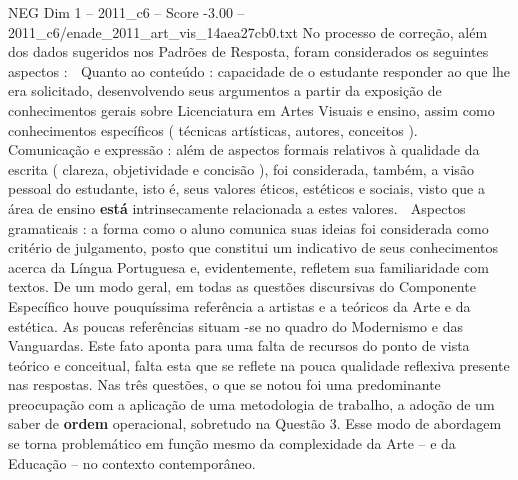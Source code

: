 \begin{textsample}{NEG Dim 1 – 2011\_c6 – Score -3.00 – 2011\_c6/enade\_2011\_art\_vis\_14aea27cb0.txt}
No processo de correção, além dos dados sugeridos nos Padrões de Resposta, foram considerados os seguintes aspectos :  Quanto ao conteúdo : capacidade de o estudante responder ao que lhe era solicitado, desenvolvendo seus argumentos a partir da exposição de conhecimentos gerais sobre Licenciatura em Artes Visuais e ensino, assim como conhecimentos específicos ( técnicas artísticas, autores, conceitos ).  Comunicação e expressão : além de aspectos formais relativos à qualidade da escrita ( clareza, objetividade e concisão ), foi considerada, também, a visão pessoal do estudante, isto é, seus valores éticos, estéticos e sociais, visto que a área de ensino \textbf{está} intrinsecamente relacionada a estes valores.  Aspectos gramaticais : a forma como o aluno comunica suas ideias foi considerada como critério de julgamento, posto que constitui um indicativo de seus conhecimentos acerca da Língua Portuguesa e, evidentemente, refletem sua familiaridade com textos.
De um modo geral, em todas as questões discursivas do Componente Específico houve pouquíssima referência a artistas e a teóricos da Arte e da estética.
As poucas referências situam -se no quadro do Modernismo e das Vanguardas.
Este fato aponta para uma falta de recursos do ponto de vista teórico e conceitual, falta esta que se reflete na pouca qualidade reflexiva presente nas respostas.
Nas três questões, o que se notou foi uma predominante preocupação com a aplicação de uma metodologia de trabalho, a adoção de um saber de \textbf{ordem} operacional, sobretudo na Questão 3.
Esse modo de abordagem se torna problemático em função mesmo da complexidade da Arte – e da Educação – no contexto contemporâneo.

\end{textsample}
